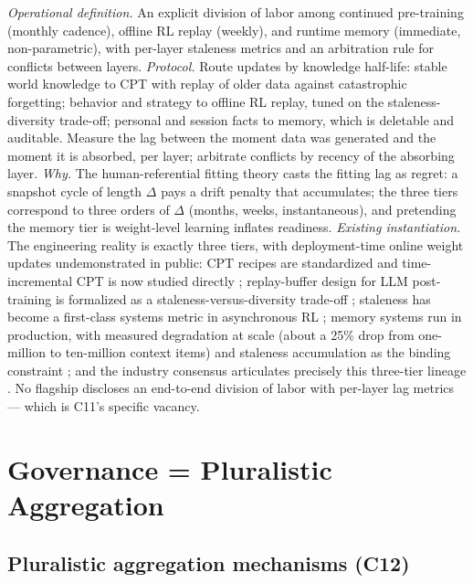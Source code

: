 \documentclass[10pt]{article}
\begin{document}
\emph{Operational definition.} An explicit division of labor among continued pre-training (monthly cadence), offline RL replay (weekly), and runtime memory (immediate, non-parametric), with per-layer staleness metrics and an arbitration rule for conflicts between layers. \emph{Protocol.} Route updates by knowledge half-life: stable world knowledge to CPT with replay of older data against catastrophic forgetting; behavior and strategy to offline RL replay, tuned on the staleness-diversity trade-off; personal and session facts to memory, which is deletable and auditable. Measure the lag between the moment data was generated and the moment it is absorbed, per layer; arbitrate conflicts by recency of the absorbing layer. \emph{Why.} The human-referential fitting theory casts the fitting lag as regret: a snapshot cycle of length $\Delta$ pays a drift penalty that accumulates; the three tiers correspond to three orders of $\Delta$ (months, weeks, instantaneous), and pretending the memory tier is weight-level learning inflates readiness. \emph{Existing instantiation.} The engineering reality is exactly three tiers, with deployment-time online weight updates undemonstrated in public: CPT recipes are standardized \cite{ref45,ref46} and time-incremental CPT is now studied directly \cite{ref47}; replay-buffer design for LLM post-training is formalized as a staleness-versus-diversity trade-off \cite{ref48}; staleness has become a first-class systems metric in asynchronous RL \cite{ref49}; memory systems run in production, with measured degradation at scale (about a 25\% drop from one-million to ten-million context items) and staleness accumulation as the binding constraint \cite{ref50}; and the industry consensus articulates precisely this three-tier lineage \cite{ref51}. No flagship discloses an end-to-end division of labor with per-layer lag metrics --- which is C11's specific vacancy.

\section{Governance = Pluralistic Aggregation}

\subsection{Pluralistic aggregation mechanisms (C12)}
\end{document}
